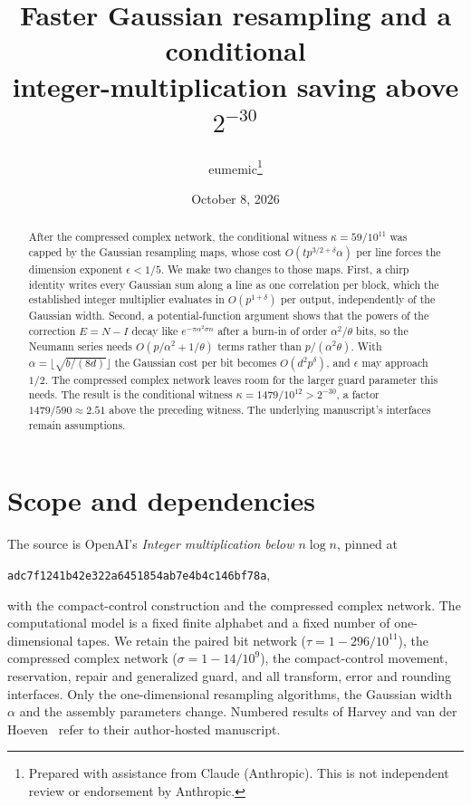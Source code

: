 \documentclass[11pt]{article}
\title{Faster Gaussian resampling and a conditional\\
integer-multiplication saving above $2^{-30}$}
\author{eumemic\thanks{Prepared with assistance from Claude (Anthropic).
This is not independent review or endorsement by Anthropic.}}
\date{October 8, 2026}
\begin{document}
\maketitle
\begin{abstract}
After the compressed complex network, the conditional witness
$\kappa=59/10^{11}$ was capped by the Gaussian resampling maps, whose cost
$O(tp^{3/2+\delta}\alpha)$ per line forces the dimension exponent
$\epsilon<1/5$. We make two changes to those maps. First, a chirp identity
writes every Gaussian sum along a line as one correlation per block, which the
established integer multiplier evaluates in $O(p^{1+\delta})$ per output,
independently of the Gaussian width. Second, a potential-function argument
shows that the powers of the correction $E=N-I$ decay like
$e^{-\pi\alpha^2\sigma n}$ after a burn-in of order $\alpha^2/\theta$ bits,
so the Neumann series needs $O(p/\alpha^2+1/\theta)$ terms rather than
$p/(\alpha^2\theta)$. With $\alpha=\lfloor\sqrt{b/(8d)}\rfloor$ the Gaussian
cost per bit becomes $O(d^2p^\delta)$, and $\epsilon$ may approach $1/2$. The
compressed complex network leaves room for the larger guard parameter this
needs. The result is the conditional witness $\kappa=1479/10^{12}>2^{-30}$, a
factor $1479/590\approx2.51$ above the preceding witness. The underlying
manuscript's interfaces remain assumptions.
\end{abstract}

\section{Scope and dependencies}
The source is OpenAI's \emph{Integer multiplication below $n\log n$}, pinned at
\begin{center}\texttt{adc7f1241b42e322a6451854ab7e4b4c146bf78a},\end{center}
with the compact-control construction and the compressed complex network. The
computational model is a fixed finite alphabet and a fixed number of
one-dimensional tapes. We retain the paired bit network ($\tau=1-296/10^{11}$),
the compressed complex network ($\sigma=1-14/10^9$), the compact-control
movement, reservation, repair and generalized guard, and all transform, error
and rounding interfaces. Only the one-dimensional resampling algorithms, the
Gaussian width $\alpha$ and the assembly parameters change. Numbered results of
Harvey and van der Hoeven~\cite{HarveyHoeven2021} refer to their author-hosted
manuscript.
\end{document}
